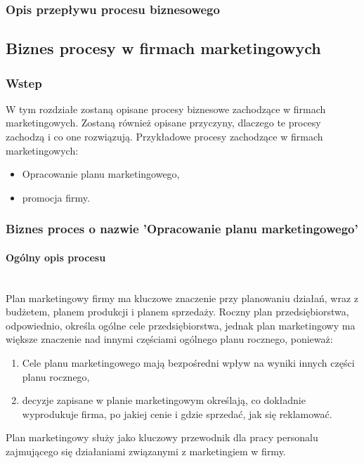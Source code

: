 \documentclass[a4paper, 12pt]{article}
\begin{document}
\subsubsection{Opis przepływu procesu biznesowego}






\subsection{Biznes procesy w firmach marketingowych}
\subsubsection{Wstep}
\hspace*{1 cm} W tym rozdziałe zostaną opisane procesy biznesowe zachodzące w firmach marketingowych. Zostaną również opisane przyczyny, dlaczego te procesy zachodzą i co one rozwiązują. Przykładowe procesy zachodzące w firmach marketingowych:
\begin{itemize}
	\item Opracowanie planu marketingowego,
	\item promocja firmy.
\end{itemize}
\subsubsection{Biznes proces o nazwie 'Opracowanie planu marketingowego'}
\paragraph{Ogólny opis procesu}\mbox{}\\
\hspace*{1 cm}Plan marketingowy firmy ma kluczowe znaczenie przy planowaniu działań, wraz z budżetem, planem produkcji i planem sprzedaży. Roczny plan przedsiębiorstwa, odpowiednio, określa ogólne cele przedsiębiorstwa, jednak plan marketingowy ma większe znaczenie nad innymi częściami ogólnego planu rocznego, ponieważ:
\begin{enumerate}
	\item Cele planu marketingowego mają bezpośredni wpływ na wyniki innych części planu rocznego,
	\item decyzje zapisane w planie marketingowym określają, co dokładnie wyprodukuje firma, po jakiej cenie i gdzie sprzedać, jak się reklamować.
\end{enumerate}
\hspace*{1 cm}Plan marketingowy służy jako kluczowy przewodnik dla pracy personalu zajmującego się działaniami związanymi z marketingiem w firmy.
\end{document}

